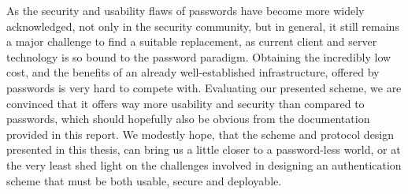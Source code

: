 As the security and usability flaws of passwords have become more widely acknowledged, not only in the security community, but in general, it still remains a major challenge to find a suitable replacement, as current client and server technology is so bound to the password paradigm. 
Obtaining the incredibly low cost, and the benefits of an already well-established infrastructure, offered by passwords is very hard to compete with. Evaluating our presented scheme, we are convinced that it offers way more usability and security than compared to passwords, which should hopefully also be obvious from the documentation provided in this report. We modestly hope, that the scheme and protocol design presented in this thesis, can bring us a little closer to a password-less world, or at the very least shed light on the challenges involved in designing an authentication scheme that must be both usable, secure and deployable. 